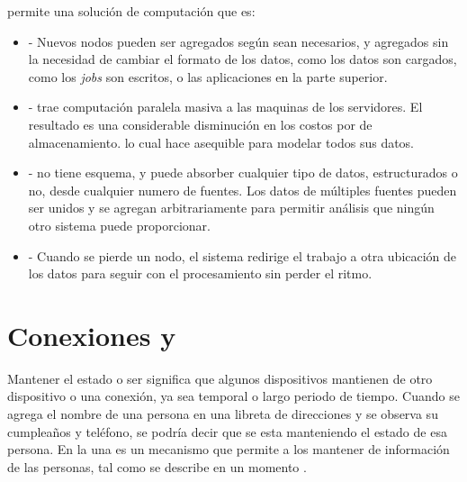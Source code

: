 \hadoopNAME permite una solución de computación que es:

\begin{itemize}
	\item \textbf{\scalableQA}- Nuevos nodos pueden ser agregados según sean necesarios, y agregados sin la necesidad de cambiar el formato de los datos, como los datos son cargados, como los \textit{jobs} son escritos, o las aplicaciones en la parte superior.
	
	\item \textbf{\costEffectiveCPT}- \hadoopNAME trae computación paralela masiva a las maquinas de los servidores. El resultado es una considerable disminución en los costos por \terabytePC de almacenamiento. lo cual hace asequible para modelar todos sus datos.
	
	\item \textbf{\flexibleQA}- \hadoopNAME no tiene esquema, y puede absorber cualquier tipo de datos, estructurados o no, desde cualquier numero de fuentes. Los datos de múltiples fuentes pueden ser unidos y se agregan arbitrariamente para permitir análisis que ningún otro sistema puede proporcionar.
	
	\item \textbf{\faultTolerantQA}- Cuando se pierde un nodo, el sistema redirige el trabajo a otra ubicación de los datos para seguir con el procesamiento sin perder el ritmo.
\end{itemize}

\chapter{Conexiones \stateful y \stateless }\label{ap:apendice_connection_statful_stateless}

Mantener el estado o ser \stateful significa que algunos dispositivos mantienen \trackCPT de otro dispositivo o una conexión, ya sea temporal o largo periodo de tiempo. Cuando se agrega el nombre de una persona en una libreta de direcciones y se observa su cumpleaños y teléfono, se podría decir que se esta manteniendo el estado de esa persona. En la \web una \cookieINT es un mecanismo \stateful que permite a los \webserver mantener \trackCPT de información de las personas, tal como se describe en un momento \cite{online_connection_stateful_stateless}.


